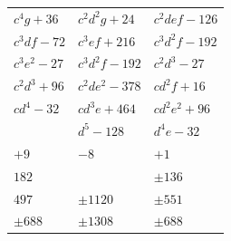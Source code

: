 \documentclass[11pt]{article}
\begin{document}
\begin{center}
\begin{tabular}{|l|l|l|}
$c^{4}g+36$ & $c^{2}d^{2}g+24$ & $c^{2}def-126$\\
$c^{3}df-72$ & $c^{3}ef+216$ & $c^{3}d^{2}f-192$\\
$c^{3}e^{2}-27$ & $c^{3}d^{2}f-192$ & $c^{2}d^{3}-27$\\
$c^{2}d^{3}+96$ & $c^{2}de^{2}-378$ & $cd^{2}f+16$\\
$cd^{4}-32$ & $cd^{3}e+464$ & $cd^{2}e^{2}+96$\\
& $d^{5}-128$ & $d^{4}e-32$\\
\hline
$+9$ & $-8$ & $+1$\\
$182$ & & $\pm 136$\\
$497$ & $\pm 1120$ & $\pm 551$\\
$\pm 688$ & $\pm 1308$ & $\pm 688$\\
\hline
\end{tabular}
\end{center}

\newpage
\end{document}

